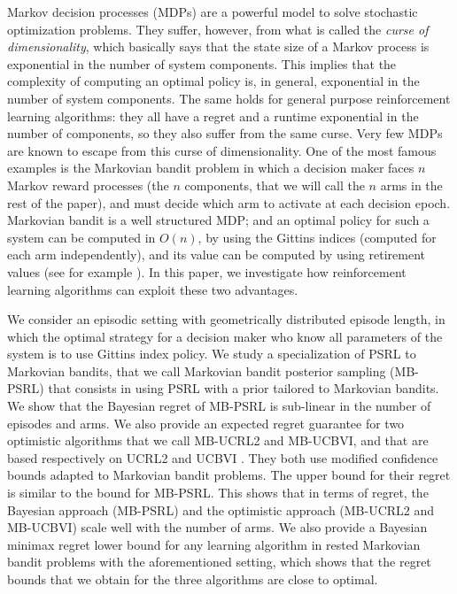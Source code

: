Markov decision processes (MDPs) are a powerful model to solve stochastic optimization problems. They suffer, however, from what is called the \emph{curse of dimensionality}, which basically says that the state size of a Markov process is exponential in the number of system components. This implies that the complexity of computing an optimal policy is, in general, exponential in the number of system components. The same holds for general purpose reinforcement learning algorithms: they all have a regret and a runtime exponential in the number of components, so they also suffer from the same curse. Very few MDPs are known to escape from this curse of dimensionality. One of the most famous examples is the Markovian bandit problem in which a decision maker faces $n$ Markov reward processes (the $n$ components, that we will call the $n$ arms in the rest of the paper), and must decide which arm to activate at each decision epoch. Markovian bandit is a well structured MDP; and an optimal policy for such a system can be computed in $O(n)$, by using the Gittins indices (computed for each arm independently), and its value can be computed by using retirement values (see for example \cite{whittle1996optimal}). In this paper, we investigate how reinforcement learning algorithms can exploit these two advantages.

We consider an episodic setting with geometrically distributed episode length, in which the optimal strategy for a decision maker who know all parameters of the system is to use Gittins index policy. We study a specialization of PSRL \cite{osband2013more} to Markovian bandits, that we call Markovian bandit posterior sampling (MB-PSRL) that consists in using PSRL with a prior tailored to Markovian bandits. We show that the Bayesian regret of MB-PSRL is sub-linear in the number of episodes and arms. We also provide an expected regret guarantee for two optimistic algorithms that we call MB-UCRL2 and MB-UCBVI, and that are based respectively on UCRL2 \cite{jaksch2010near} and UCBVI \cite{azar2017minimax}. They both use modified  confidence bounds adapted to Markovian bandit problems. The upper bound for their regret is similar to the bound for MB-PSRL. This shows that in terms of regret, the Bayesian approach (MB-PSRL) and the optimistic approach (MB-UCRL2 and MB-UCBVI) scale well with the number of arms. We also provide a Bayesian minimax regret lower bound for any learning algorithm in rested Markovian bandit problems with the aforementioned setting, which shows that the regret bounds that we obtain for the three algorithms are close to optimal.

